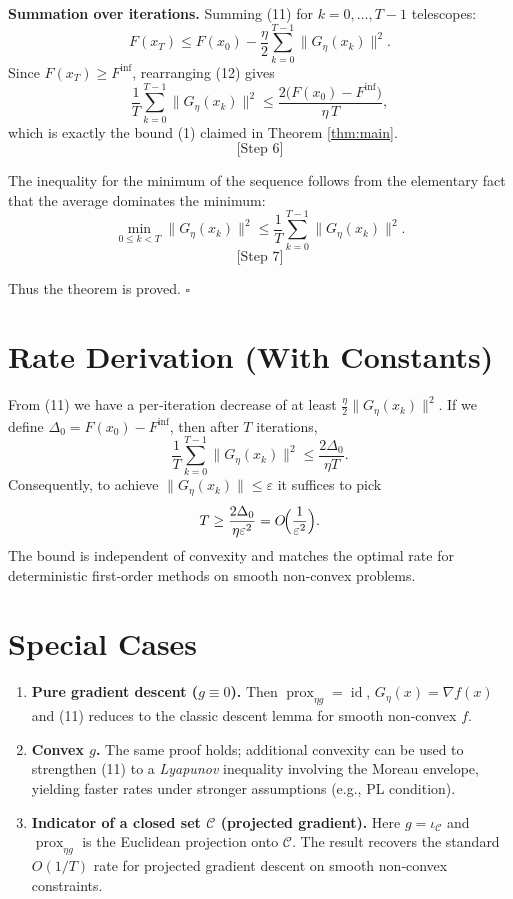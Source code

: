 \documentclass{article}
\newcommand{\prox}{\operatorname{prox}}
\newcommand{\grad}{\nabla}
\begin{document}
\noindent \textbf{Summation over iterations.} Summing (11) for $k=0,\dots,T-1$ telescopes:
\[
F(x_{T})\le F(x_{0})-\frac{\eta}{2}\sum_{k=0}^{T-1}\|G_{\eta}(x_{k})\|^{2}.
\tag{12}
\]
Since $F(x_{T})\ge F^{\inf}$, rearranging (12) gives
\[
\frac{1}{T}\sum_{k=0}^{T-1}\|G_{\eta}(x_{k})\|^{2}
\le \frac{2\bigl(F(x_{0})-F^{\inf}\bigr)}{\eta\,T},
\]
which is exactly the bound (1) claimed in Theorem \ref{thm:main}.  
\[
\text{[Step 6]}
\]

\noindent The inequality for the minimum of the sequence follows from the elementary fact that the average dominates the minimum:
\[
\min_{0\le k<T}\|G_{\eta}(x_{k})\|^{2}
\le\frac{1}{T}\sum_{k=0}^{T-1}\|G_{\eta}(x_{k})\|^{2}.
\tag{13}
\]
\[
\text{[Step 7]}
\]

Thus the theorem is proved. \hfill $\square$

\section*{Rate Derivation (With Constants)}
From (11) we have a per‑iteration decrease of at least $\frac{\eta}{2}\|G_{\eta}(x_{k})\|^{2}$. If we define $\Delta_{0}=F(x_{0})-F^{\inf}$, then after $T$ iterations,
\[
\frac{1}{T}\sum_{k=0}^{T-1}\|G_{\eta}(x_{k})\|^{2}
\le \frac{2\Delta_{0}}{\eta T}.
\]
Consequently, to achieve $\|G_{\eta}(x_{k})\|\le\varepsilon$ it suffices to pick
\[
T\ge \frac{2\Delta_{0}}{\eta\varepsilon^{2}}=O\!\Bigl(\frac{1}{\varepsilon^{2}}\Bigr).
\]
The bound is independent of convexity and matches the optimal rate for deterministic first‑order methods on smooth non‑convex problems.

\section*{Special Cases}
\begin{enumerate}[label=\alph*)]
\item \textbf{Pure gradient descent ($g\equiv0$).} Then $\prox_{\eta g}=\operatorname{id}$, $G_{\eta}(x)=\grad f(x)$ and (11) reduces to the classic descent lemma for smooth non‑convex $f$.
\item \textbf{Convex $g$.} The same proof holds; additional convexity can be used to strengthen (11) to a \emph{Lyapunov} inequality involving the Moreau envelope, yielding faster rates under stronger assumptions (e.g., PL condition).
\item \textbf{Indicator of a closed set $\mathcal{C}$ (projected gradient).} Here $g=\iota_{\mathcal{C}}$ and $\prox_{\eta g}$ is the Euclidean projection onto $\mathcal{C}$. The result recovers the standard $O(1/T)$ rate for projected gradient descent on smooth non‑convex constraints.
\end{enumerate}
\end{document}
